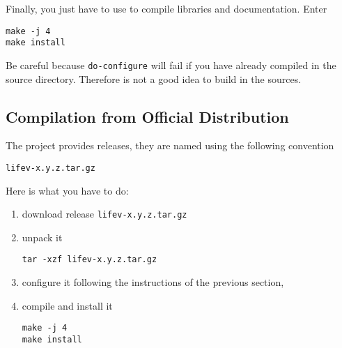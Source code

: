 
%
%


\noindent Finally, you just have to use  to compile \lifev libraries and documentation.
Enter
\begin{verbatim}
make -j 4
make install
\end{verbatim}

\noindent Be careful because \verb!do-configure! will fail if you have already compiled
\lifev in the source directory. Therefore is not a good idea to build in the sources.

\subsection{Compilation from Official Distribution}
\label{sec:comp-from-offic}
The \lifev project provides releases, they are named using the following convention
\begin{center}
\verb!lifev-x.y.z.tar.gz!
\end{center}

Here is what you have to do:

\begin{enumerate}
\item download \lifev release \verb!lifev-x.y.z.tar.gz!
\item unpack it
\begin{verbatim}
tar -xzf lifev-x.y.z.tar.gz
\end{verbatim}
\item configure it following the instructions of the previous section,
\item compile and install it
\begin{verbatim}
make -j 4
make install
\end{verbatim}
\end{enumerate}


